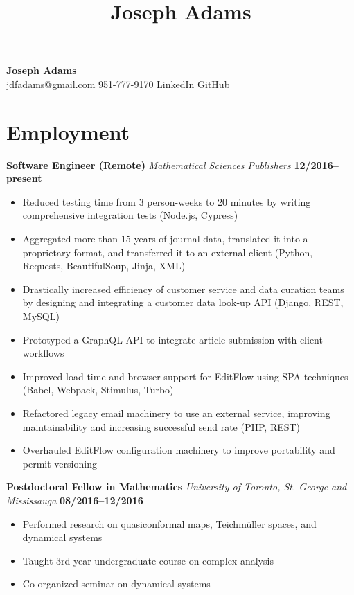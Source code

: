 \documentclass[11pt]{article}
\title{Joseph Adams}
\makeatletter
\newcommand\email{jdfadams@gmail.com}
\newcommand\phone{951-777-9170}
\makeatother
\begin{document}

\begin{center}
  \textbf{\Large Joseph Adams} \\[1.5\baselineskip]
  \href{mailto:\email}{\email} \quad
  \href{tel:1-\phone}{\phone} \quad
  \href{http://linkedin.com/in/jdfadams}{LinkedIn} \quad
  \href{http://github.com/jdfadams}{GitHub}
\end{center}

\section*{Employment}
\noindent\textbf{Software Engineer (Remote)} \emph{Mathematical Sciences Publishers} \hfill \textbf{12/2016--present}
\begin{itemize}
  \item Reduced testing time from 3 person-weeks to 20 minutes by writing comprehensive integration tests (Node.js, Cypress)
  \item Aggregated more than 15 years of journal data, translated it into a proprietary format, and transferred it to an external client (Python, Requests, BeautifulSoup, Jinja, XML)
  \item Drastically increased efficiency of customer service and data curation teams by designing and integrating a customer data look-up API (Django, REST, MySQL)
  \item Prototyped a GraphQL API to integrate article submission with client workflows
  \item Improved load time and browser support for EditFlow using SPA techniques (Babel, Webpack, Stimulus, Turbo)
  \item Refactored legacy email machinery to use an external service, improving maintainability and increasing successful send rate (PHP, REST)
  \item Overhauled EditFlow configuration machinery to improve portability and permit versioning
\end{itemize}
\vspace{0.5cm}
\noindent\textbf{Postdoctoral Fellow in Mathematics} \emph{University of Toronto, St. George and Mississauga} \hfill \textbf{08/2016--12/2016}
\begin{itemize}
  \itemsep 0em
  \item Performed research on quasiconformal maps, Teichm\"{u}ller spaces, and dynamical systems
  \item Taught 3rd-year undergraduate course on complex analysis
  \item Co-organized seminar on dynamical systems
\end{itemize}
\end{document}
